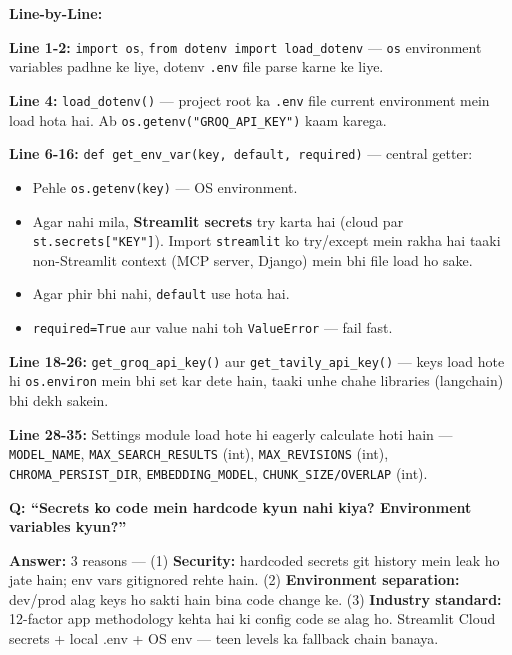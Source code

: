 \documentclass[11pt, a4paper]{article}
\begin{document}
\begin{codestorybox}
\textbf{Line-by-Line:}

\textbf{Line 1-2:} \texttt{import os}, \texttt{from dotenv import load\_dotenv} --- \texttt{os} environment variables padhne ke liye, dotenv \texttt{.env} file parse karne ke liye.

\textbf{Line 4:} \texttt{load\_dotenv()} --- project root ka \texttt{.env} file current environment mein load hota hai. Ab \texttt{os.getenv("GROQ\_API\_KEY")} kaam karega.

\textbf{Line 6-16:} \texttt{def get\_env\_var(key, default, required)} --- central getter:
\begin{itemize}
\item Pehle \texttt{os.getenv(key)} --- OS environment.
\item Agar nahi mila, \textbf{Streamlit secrets} try karta hai (cloud par \texttt{st.secrets["KEY"]}). Import \texttt{streamlit} ko try/except mein rakha hai taaki non-Streamlit context (MCP server, Django) mein bhi file load ho sake.
\item Agar phir bhi nahi, \texttt{default} use hota hai.
\item \texttt{required=True} aur value nahi toh \texttt{ValueError} --- fail fast.
\end{itemize}

\textbf{Line 18-26:} \texttt{get\_groq\_api\_key()} aur \texttt{get\_tavily\_api\_key()} --- keys load hote hi \texttt{os.environ} mein bhi set kar dete hain, taaki unhe chahe libraries (langchain) bhi dekh sakein.

\textbf{Line 28-35:} Settings module load hote hi eagerly calculate hoti hain --- \texttt{MODEL\_NAME}, \texttt{MAX\_SEARCH\_RESULTS} (int), \texttt{MAX\_REVISIONS} (int), \texttt{CHROMA\_PERSIST\_DIR}, \texttt{EMBEDDING\_MODEL}, \texttt{CHUNK\_SIZE/OVERLAP} (int).
\end{codestorybox}

\begin{interviewbox}
\textbf{Q: ``Secrets ko code mein hardcode kyun nahi kiya? Environment variables kyun?''}

\textbf{Answer:} 3 reasons --- (1) \textbf{Security:} hardcoded secrets git history mein leak ho jate hain; env vars gitignored rehte hain. (2) \textbf{Environment separation:} dev/prod alag keys ho sakti hain bina code change ke. (3) \textbf{Industry standard:} 12-factor app methodology kehta hai ki config code se alag ho. Streamlit Cloud secrets + local .env + OS env --- teen levels ka fallback chain banaya.
\end{interviewbox}
\end{document}

